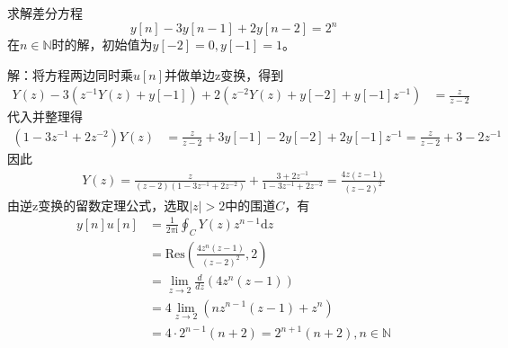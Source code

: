 \begin{example}
    求解差分方程
    $$y[n]-3y[n-1]+2y[n-2]=2^n$$
    在$n\in\mathbb{N}$时的解，初始值为$y[-2]=0,y[-1]=1$。

    解：将方程两边同时乘$u[n]$并做单边z变换，得到\begin{align*}
    Y(z)-3(z^{-1}Y(z)+y[-1])+2(z^{-2}Y(z)+y[-2]+y[-1]z^{-1})&=\frac{z}{z-2}
    \end{align*}
    代入并整理得\begin{align*}
    (1-3z^{-1}+2z^{-2})Y(z)&=\frac{z}{z-2}+3y[-1]-2y[-2]+2y[-1]z^{-1}=\frac{z}{z-2}+3-2z^{-1}
    \end{align*}
    因此\begin{align*}
    Y(z)=\frac{z}{(z-2)(1-3z^{-1}+2z^{-2})}+\frac{3+2z^{-1}}{1-3z^{-1}+2z^{-2}}=\frac{4z(z-1)}{(z-2)^2}
    \end{align*}
    由逆z变换的留数定理公式，选取$|z|>2$中的围道$C$，有\begin{align*}
    y[n]u[n]&=\frac{1}{2\pi\mathrm{i}}\oint_{C}Y(z)z^{n-1}\mathrm{d}z\\
    &=\mathrm{Res}\left(\frac{4z^n(z-1)}{(z-2)^2},2\right)\\
    &=\lim_{z\to 2}\frac{d}{dz}\left(4z^n(z-1)\right)\\
    &=4\lim_{z\to 2}\left(nz^{n-1}(z-1)+z^n\right)\\
    &=4\cdot 2^{n-1}(n+2)=2^{n+1}(n+2),n\in\mathbb{N}
\end{align*}
\end{example}
